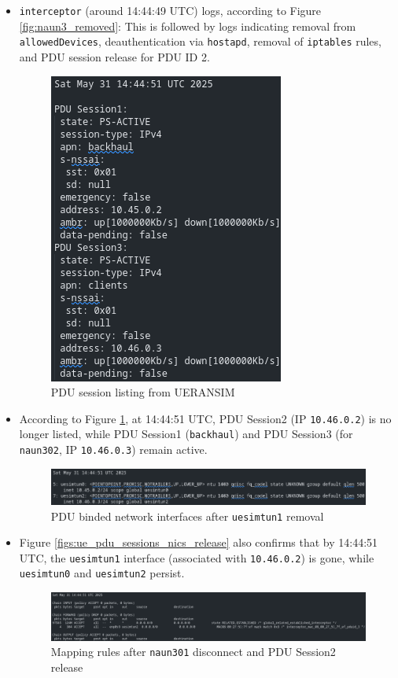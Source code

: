 \begin{itemize}
    \item \texttt{interceptor} (around 14:44:49 \ac{UTC}) logs, according to Figure \ref{fig:naun3_removed}:  This is followed by logs indicating removal from \texttt{allowedDevices}, deauthentication via \texttt{hostapd}, removal of \texttt{iptables} rules, and \ac{PDU} session release for \ac{PDU} ID 2.

    \begin{figure}
        \centering
        \includegraphics[width=0.20\linewidth]{figs/nr-cli_ps-list.png}
        \caption{\ac{PDU} session listing from UERANSIM}
        \label{fig:nr-cli_ps-list}
    \end{figure}

    \item According to Figure \ref{fig:nr-cli_ps-list}, at 14:44:51 \ac{UTC}, \ac{PDU} Session2 (\ac{IP} \texttt{10.46.0.2}) is no longer listed, while \ac{PDU} Session1 (\texttt{backhaul}) and \ac{PDU} Session3 (for \texttt{naun302}, \ac{IP} \texttt{10.46.0.3}) remain active.

    \begin{figure}
        \centering
        \includegraphics[width=1\linewidth]{figs/ue_pdu_sessions_nics_release.png}
        \caption{\ac{PDU} binded network interfaces after \texttt{uesimtun1} removal}
        \label{fig:ue_pdu_sessions_nics_release}
    \end{figure}
    
    \item Figure \ref{figs:ue_pdu_sessions_nics_release} also confirms that by 14:44:51 \ac{UTC}, the \texttt{uesimtun1} interface (associated with \texttt{10.46.0.2}) is gone, while \texttt{uesimtun0} and \texttt{uesimtun2} persist.

    \begin{figure}
        \centering
        \includegraphics[width=1\linewidth]{figs/ue_naun3_to_pdu_mapping_rules.png}
        \caption{Mapping rules after \texttt{naun301} disconnect and \ac{PDU} Session2 release}
        \label{fig:ue_naun3_to_pdu_mapping_rules}
    \end{figure}


\end{itemize}
